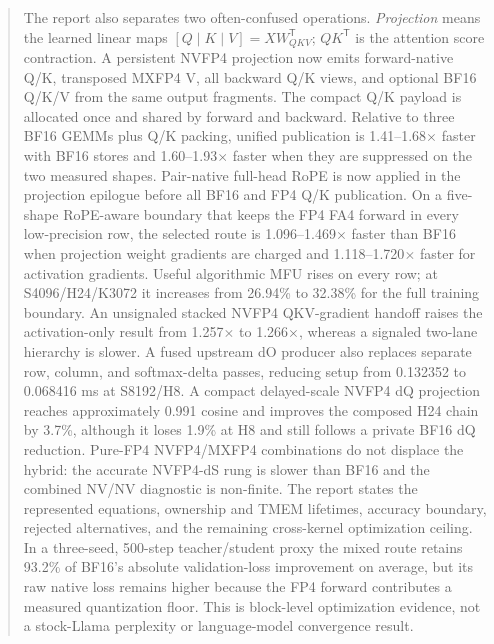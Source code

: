 \begin{abstract}
The report also separates two often-confused operations.  \emph{Projection}
means the learned linear maps $[Q\mid K\mid V]=XW_{QKV}^\mathsf{T}$;
$QK^\mathsf{T}$ is the attention score contraction.  A persistent NVFP4
projection now emits forward-native Q/K, transposed MXFP4 V, all backward Q/K
views, and optional BF16 Q/K/V from the same output fragments.  The compact
Q/K payload is allocated once and shared by forward and backward.  Relative
to three BF16 GEMMs plus Q/K packing, unified publication is
1.41--1.68$\times$ faster with BF16 stores and 1.60--1.93$\times$ faster when
they are suppressed on the two measured shapes.  Pair-native full-head RoPE
is now applied in the projection epilogue before all BF16 and FP4 Q/K
publication.  On a five-shape RoPE-aware boundary that keeps the FP4 FA4
forward in every low-precision row, the selected route is
1.096--1.469$\times$ faster than BF16 when projection weight gradients are
charged and 1.118--1.720$\times$ faster for activation gradients.  Useful
algorithmic MFU rises on every row; at S4096/H24/K3072 it increases from
26.94\% to 32.38\% for the full training boundary.  An unsignaled stacked
NVFP4 QKV-gradient handoff raises the activation-only result from
1.257$\times$ to 1.266$\times$, whereas a signaled two-lane hierarchy is
slower.  A fused
upstream dO producer also replaces separate row, column, and softmax-delta
passes, reducing setup from 0.132352 to 0.068416 ms at S8192/H8.  A compact
delayed-scale NVFP4 dQ projection reaches approximately 0.991 cosine and
improves the composed H24 chain by 3.7\%, although it loses 1.9\% at H8 and
still follows a private BF16 dQ reduction.  Pure-FP4 NVFP4/MXFP4 combinations
do not displace the hybrid:
the accurate NVFP4-dS rung is slower than BF16 and the combined NV/NV
diagnostic is non-finite.  The report states the represented equations,
ownership and TMEM lifetimes, accuracy boundary, rejected alternatives, and
the remaining cross-kernel optimization ceiling.  In a three-seed,
500-step teacher/student proxy the mixed route retains 93.2\% of BF16's
absolute validation-loss improvement on average, but its raw native loss
remains higher because the FP4 forward contributes a measured quantization
floor.  This is block-level optimization evidence, not a stock-Llama
perplexity or language-model convergence result.
\end{abstract}
